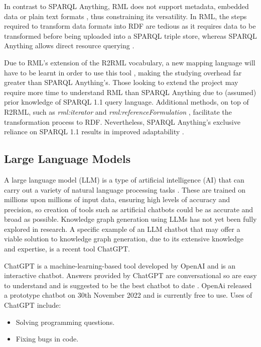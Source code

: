 In contrast to SPARQL Anything, RML does not support metadata, embedded data or plain text formats \cite{sparqlanything}, thus constraining its versatility. In RML, the steps required to transform data formats into RDF are tedious as it requires data to be transformed before being uploaded into a SPARQL triple store, whereas SPARQL Anything allows direct resource querying \cite{sparqlanything}.

Due to RML's extension of the R2RML vocabulary, a new mapping language will have to be learnt in order to use this tool \cite{sparqlanything}, making the studying overhead far greater than SPARQL Anything's. Those looking to extend the project may require more time to understand RML than SPARQL Anything due to (assumed) prior knowledge of SPARQL 1.1 query language. Additional methods, on top of R2RML, such as \textit{rml:iterator} and \textit{rml:referenceFormulation} \cite{dimou2014rml}, facilitate the transformation process to RDF. Nevertheless, SPARQL Anything's exclusive reliance on SPARQL 1.1 results in improved adaptability \cite{sparqlanything}.  

\subsection{Large Language Models}
\hspace{0.5cm} A large language model (LLM) is a type of artificial intelligence (AI) that can carry out a variety of natural language processing tasks \cite{rouse_2023}. These are trained on millions upon millions of input data, ensuring high levels of accuracy and precision, so creation of tools such as artificial chatbots could be as accurate and broad as possible. Knowledge graph generation using LLMs has not yet been fully explored in research. A specific example of an LLM chatbot that may offer a viable solution to knowledge graph generation, due to its extensive knowledge and expertise, is a recent tool ChatGPT. 

ChatGPT is a machine-learning-based tool developed by OpenAI and is an interactive chatbot. Answers provided by ChatGPT are conversational so are easy to understand and is suggested to be the best chatbot to date \cite{chatgpt}. OpenAi released a prototype chatbot on 30th November 2022 and is currently free to use. Uses of ChatGPT include:

\vspace{-0.15cm}
\begin{itemize}
    \itemsep0em 
\item Solving programming questions.
\vspace{-0.1cm}
\item Fixing bugs in code.
\end{itemize}
\vspace{-0.15cm}

